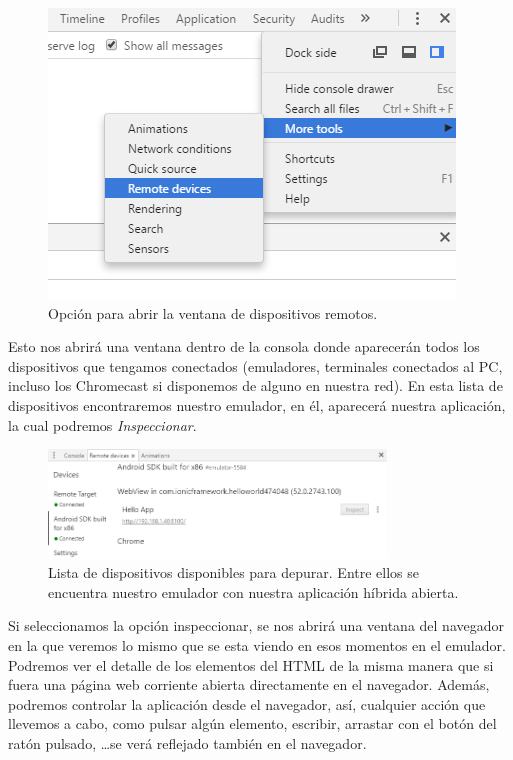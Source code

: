 \begin{figure}[H]
\centering
    \centering
        \includegraphics{Figures/ch2/BuildAndEmulate/how_open_remote_devices}
    \caption{Opción para abrir la ventana de dispositivos remotos.}
\end{figure}

Esto nos abrirá una ventana dentro de la consola donde aparecerán todos los dispositivos que tengamos conectados (emuladores, terminales conectados al PC, incluso los Chromecast si disponemos de alguno en nuestra red). En esta lista de dispositivos encontraremos nuestro emulador, en él, aparecerá nuestra aplicación, la cual podremos \emph{Inspeccionar}.

\begin{figure}[H]
\centering
    \centering
        \includegraphics[width=0.8\textwidth]{Figures/ch2/BuildAndEmulate/remote_devices_list}
    \caption{Lista de dispositivos disponibles para depurar. Entre ellos se encuentra nuestro emulador con nuestra aplicación híbrida abierta.}
\end{figure}

Si seleccionamos la opción inspeccionar, se nos abrirá una ventana del navegador en la que veremos lo mismo que se esta viendo en esos momentos en el emulador. Podremos ver el detalle de los elementos del \gls{HTML} de la misma manera que si fuera una página web corriente abierta directamente en el navegador. Además, podremos controlar la aplicación desde el navegador, así, cualquier acción que llevemos a cabo, como pulsar algún elemento, escribir, arrastar con el botón del ratón pulsado, \ldots  se verá reflejado también en el navegador.


